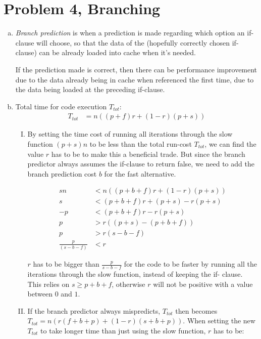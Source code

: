 \documentclass[fontsize=11pt, paper=a4, titlepage]{article}
\begin{document}
\section{Problem 4, Branching}
\begin{enumerate}[a)]

    \item \textit{Branch prediction} is when a prediction is made regarding
which  option an if-clause will choose, so that the data of the (hopefully correctly chosen if-clause) can be already loaded into cache when it's needed.

If the prediction made is correct, then there can be performance improvement due
to the data already being in cache when referenced the first time, due to the
data being loaded at the preceding if-clause.

    \item Total time for code execution $T_{tot}$:
    \begin{align*}
        T_{tot} &= n((p+f)r + (1-r)(p+s))
    \end{align*}

    \begin{enumerate}[I)]

        \item By setting the time cost of running all iterations through the
slow function $(p+s)n$ to be less than the total run-cost $T_{tot}$, we can find
the value $r$ has to be to make this a beneficial trade. But since the branch
predictor always assumes the if-clause to return false, we need to add the
branch prediction cost $b$ for the fast alternative.

        \begin{align*}
            sn &< n((p+b+f)r + (1-r)(p+s)) \\
            s &< (p+b+f)r + (p+s) - r(p+s) \\
            -p &< (p+b+f)r - r(p+s) \\
            p &> r((p+s) - (p+b+f)) \\
            p &> r(s-b-f) \\
            \frac{p}{(s-b-f)} &< r
        \end{align*}

$r$ has to be bigger than $\frac{p}{s-b-f}$ for the code to be faster by
running all the iterations through the slow function, instead of keeping the if-
clause. This relies on $s \ge p+b+f$, otherwise $r$ will not be positive with
a value between $0$ and $1$.

    \item If the branch predictor always mispredicts, $T_{tot}$ then becomes
$T_{tot} = n(r(f+b+p) + (1-r)(s+b+p))$. When setting the new $T_{tot}$ to take
longer time than just using the slow function, $r$ has to be:


\end{enumerate}
\end{enumerate}
\end{document}
